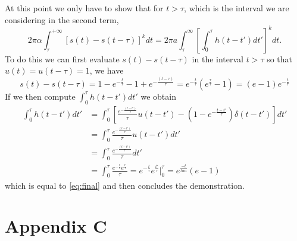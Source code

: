 At this point we only have to show that for $t>\tau$, which is the interval we are considering in the second term, 
\begin{equation}
    2\pi\alpha \int_{\tau}^{+\infty} \left[ s(t) - s(t-\tau) \right]^k dt = 2\pi a \int_{\tau}^{\infty} \left[ \int_{0}^{\tau} h(t - t') dt' \right]^k dt.
\end{equation}
%
To do this we can first evaluate $s(t)-s(t-\tau)$ in the interval $t>\tau$ so that $u(t)=u(t-\tau)=1$, we have
\begin{equation}\label{eq:final}
    s(t) - s(t-\tau) = 1- e^{-\frac{t}{\tau}} - 1 + e^{-\frac{(t-\tau)}{\tau}} = e^{-\frac{t}{\tau}} \left(e^{\frac{\tau}{\tau}}-1\right) = (e-1)e^{-\frac{t}{\tau}}
\end{equation}
%
If we then compute $\int_{0}^{\tau} h(t - t')dt'$ we obtain
\begin{align}
    \int_{0}^{\tau} h(t-t')dt' &= \int_{0}^{\tau} \left[ \frac{e^{-\frac{(t-t')}{\tau}}}{\tau} u(t-t') - \left(1-e^{-\frac{t-t'}{\tau}}\right)\delta(t-t') \right] dt'\\
    &= \int_{0}^{\tau} \frac{e^{-\frac{(t-t')}{\tau}}}{\tau} u(t-t')dt' \\
    &= \int_{0}^{\tau} \frac{e^{-\frac{(t-t')}{\tau}}}{\tau} dt'\\
    &= \int_{0}^{\tau} \frac{e^{-\frac{t}{\tau}}e^{\frac{t'}{\tau}}}{\tau} = e^{-\frac{t}{\tau}}e^{\frac{t'}{\tau}}\Big|_{0}^{\tau} = e^{\frac{-t}{tau}}(e-1)
\end{align}
which is equal to \ref{eq:final} and then concludes the demonstration.

\chapter*{Appendix C}
\label{app:AppendixC}

